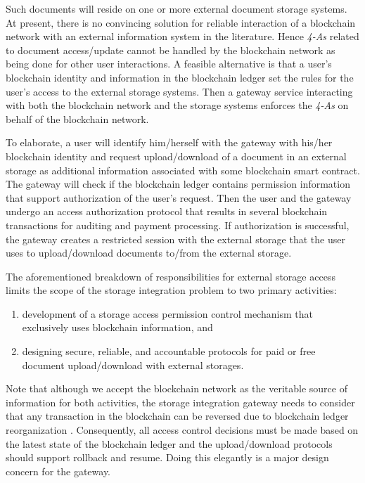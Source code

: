 \documentclass[conference]{IEEEtran}
\begin{document}
Such documents will reside on one or more external document storage systems. At present, there is no convincing solution for reliable interaction of a blockchain network with an external information system in the literature. Hence \textit{4-As} related to document access/update cannot be handled by the blockchain network as being done for other user interactions. A feasible alternative is that a user's blockchain identity and information in the blockchain ledger set the rules for the user's access to the external storage systems. Then a gateway service interacting with both the blockchain network and the storage systems enforces the \textit{4-As} on behalf of the blockchain network.

To elaborate, a user will identify him/herself with the gateway with his/her blockchain identity and request upload/download of a document in an external storage as additional information associated with some blockchain smart contract. The gateway will check if the blockchain ledger contains permission information that support authorization of the user's request. Then the user and the gateway undergo an access authorization protocol that results in several blockchain transactions for auditing and payment processing. If authorization is successful, the gateway creates a restricted session with the external storage that the user uses to upload/download documents to/from the external storage.

The aforementioned breakdown of responsibilities for external storage access limits the scope of the storage integration problem to two primary activities: 

\begin{enumerate}
\item development of a storage access permission control mechanism that exclusively uses blockchain information, and
\item designing secure, reliable, and accountable protocols for paid or free document upload/download with external storages. 
\end{enumerate}          

Note that although we accept the blockchain network as the veritable source of information for both activities, the storage integration gateway needs to consider that any transaction in the blockchain can be reversed due to blockchain ledger reorganization \cite{reorg}. Consequently, all access control decisions must be made based on the latest state of the blockchain ledger and the upload/download protocols should support rollback and resume. Doing this elegantly is a major design concern for the gateway.
\end{document}
